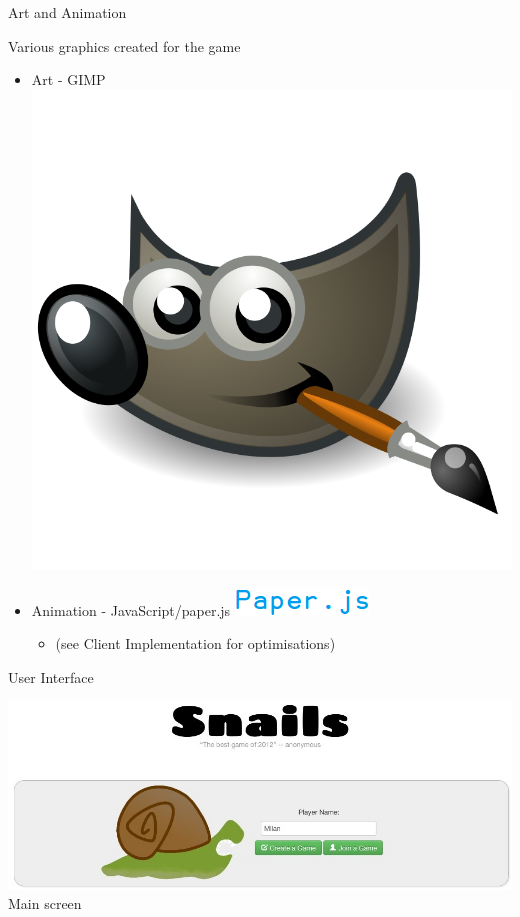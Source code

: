 \documentclass{beamer}
\begin{document}
\begin{frame}{Art and Animation}
\begin{center}
    Various graphics created for the game
  \end{center}
  \begin{itemize}
    \item Art - GIMP
      \hfill
      \includegraphics[scale=0.025]{gimp_logo.png}
    \item Animation - JavaScript/paper.js
      \hfill
      \includegraphics[scale=0.4]{paper_logo.png}
      \begin{itemize}
        \item (see Client Implementation for optimisations)
      \end{itemize}
  \end{itemize}
\end{frame}

\begin{frame}{User Interface}
  \begin{center}
    \includegraphics[scale=0.35]{index.jpg} \\
    Main screen
  \end{center}
\end{frame}
\end{document}

